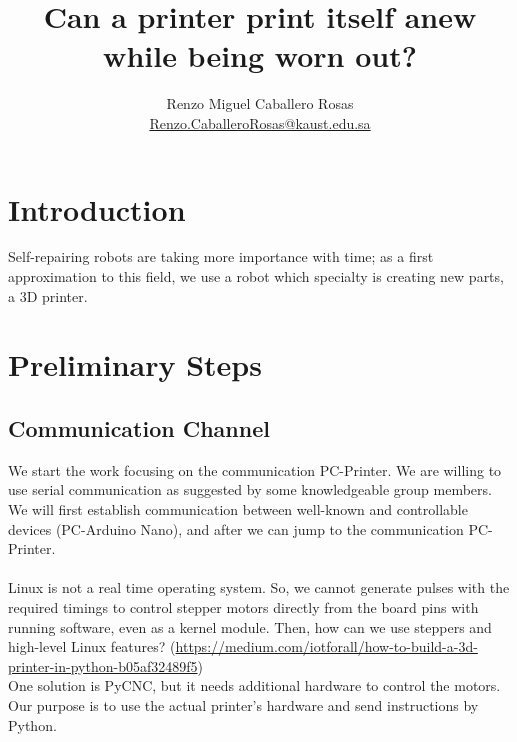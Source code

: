 \documentclass[12pt]{article}
\theoremstyle{definition}
\theoremstyle{remark}
\begin{document}
\title{Can a printer print itself anew while being worn out?}
\author{Renzo Miguel Caballero Rosas\\
\url{Renzo.CaballeroRosas@kaust.edu.sa}} 
\maketitle

\tableofcontents

\section{Introduction}

Self-repairing robots are taking more importance with time; as a first approximation to this field, we use a robot which specialty is creating new parts, a 3D printer.

\section{Preliminary Steps}

\subsection{Communication Channel}

We start the work focusing on the communication PC-Printer. We are willing to use serial communication as suggested by some knowledgeable group members. We will first establish communication between well-known and controllable devices (PC-Arduino Nano), and after we can jump to the communication PC-Printer.\\
\quad\\
Linux is not a real time operating system. So, we cannot generate pulses with the required timings to control stepper motors directly from the board pins with running software, even as a kernel module. Then, how can we use steppers and high-level Linux features? (\url{https://medium.com/iotforall/how-to-build-a-3d-printer-in-python-b05af32489f5})\\
One solution is PyCNC, but it needs additional hardware to control the motors. Our purpose is to use the actual printer's hardware and send instructions by Python.
\end{document}
